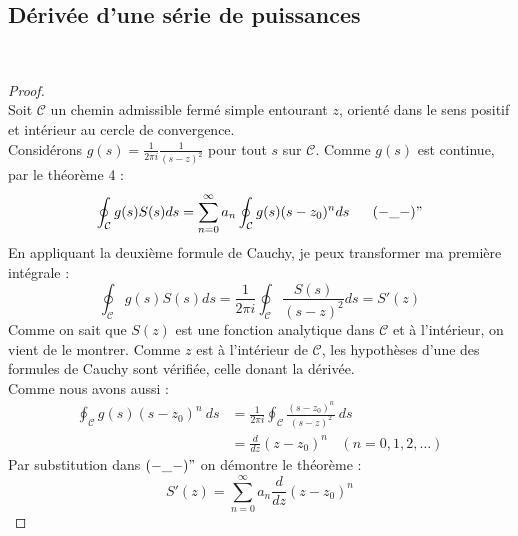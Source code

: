 \subsection{Dérivée d'une série de puissances}
\ \\	
\begin{proof}\ \\
	Soit $\mathcal{C}$ un chemin admissible fermé simple entourant $z$, orienté dans le sens 
	positif et intérieur au cercle de convergence.\\
	Considérons $g(s) = \frac{1}{2\pi i}\frac{1}{(s-z)^2}$ pour tout $s$ sur $\mathcal{C}$.
	Comme $g(s)$ est continue, par le théorème 4 :
	\begin{equation}
		\oint_\mathcal{C}g(s) S(s) ds = \sum_{n=0}^\infty a_n\oint_\mathcal{C}g(s)(s-z_0)^n ds\ \ \ \ \ (-\_-)"
	\end{equation}
	En appliquant la deuxième formule de Cauchy, je peux transformer ma première intégrale :
	\begin{equation}
		\oint_\mathcal{C}g(s) S(s) ds = \frac{1}{2\pi i}\oint_\mathcal{C}\frac{S(s)}{(s-z)^2}ds = 
		S'(z)
	\end{equation}
	Comme on sait que $S(z)$ est une fonction analytique dans $\mathcal{C}$ et à l'intérieur, 
	on vient de le montrer. Comme $z$ est à l'intérieur de $\mathcal{C}$, les hypothèses d'une 
	des formules de Cauchy sont vérifiée, celle donant la dérivée. \\
	Comme nous avons aussi :
	\begin{equation}
		\begin{array}{ll}
			\oint_\mathcal{C} g(s)(s-z_0)^n\ ds & = \frac{1}{2\pi i}\oint_\mathcal{C}\frac{(s-z_0)^n}{ 
			(s-z)^2}\ ds\\
			                                    & = \frac{d}{dz}(z-z_0)^n\ \ \ \ (n=0,1,2,\dots)       
		\end{array}
	\end{equation}
	Par substitution dans $(-\_-)"$ on démontre le théorème :
	\begin{equation}
		S'(z) = \sum_{n=0}^\infty a_n\frac{d}{dz}(z-z_0)^n
	\end{equation}
\end{proof}

